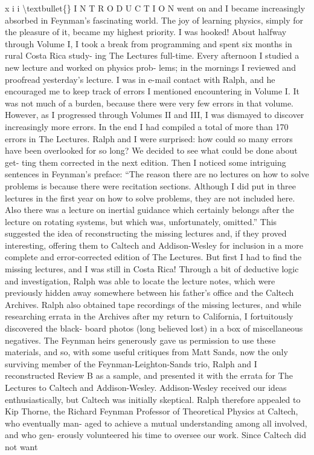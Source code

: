 \documentclass[10pt,oneside]{article}
\begin{document}
x i i \textbackslash{}textbullet\{\} I N T R O D U C T I O N went on and I became increasingly absorbed in Feynman’s fascinating world. The joy of learning physics, simply for the pleasure of it, became my highest priority. I was hooked! About halfway through Volume I, I took a break from programming and spent six months in rural Costa Rica study- ing The Lectures full-time. Every afternoon I studied a new lecture and worked on physics prob- lems; in the mornings I reviewed and proofread yesterday’s lecture. I was in e-mail contact with Ralph, and he encouraged me to keep track of errors I mentioned encountering in Volume I. It was not much of a burden, because there were very few errors in that volume. However, as I progressed through Volumes II and III, I was dismayed to discover increasingly more errors. In the end I had compiled a total of more than 170 errors in The Lectures. Ralph and I were surprised: how could so many errors have been overlooked for so long? We decided to see what could be done about get- ting them corrected in the next edition. Then I noticed some intriguing sentences in Feynman’s preface: “The reason there are no lectures on how to solve problems is because there were recitation sections. Although I did put in three lectures in the first year on how to solve problems, they are not included here. Also there was a lecture on inertial guidance which certainly belongs after the lecture on rotating systems, but which was, unfortunately, omitted.” This suggested the idea of reconstructing the missing lectures and, if they proved interesting, offering them to Caltech and Addison-Wesley for inclusion in a more complete and error-corrected edition of The Lectures. But first I had to find the missing lectures, and I was still in Costa Rica! Through a bit of deductive logic and investigation, Ralph was able to locate the lecture notes, which were previously hidden away somewhere between his father’s office and the Caltech Archives. Ralph also obtained tape recordings of the missing lectures, and while researching errata in the Archives after my return to California, I fortuitously discovered the black- board photos (long believed lost) in a box of miscellaneous negatives. The Feynman heirs generously gave us permission to use these materials, and so, with some useful critiques from Matt Sands, now the only surviving member of the Feynman-Leighton-Sands trio, Ralph and I reconstructed Review B as a sample, and presented it with the errata for The Lectures to Caltech and Addison-Wesley. Addison-Wesley received our ideas enthusiastically, but Caltech was initially skeptical. Ralph therefore appealed to Kip Thorne, the Richard Feynman Professor of Theoretical Physics at Caltech, who eventually man- aged to achieve a mutual understanding among all involved, and who gen- erously volunteered his time to oversee our work. Since Caltech did not want\par
\end{document}
